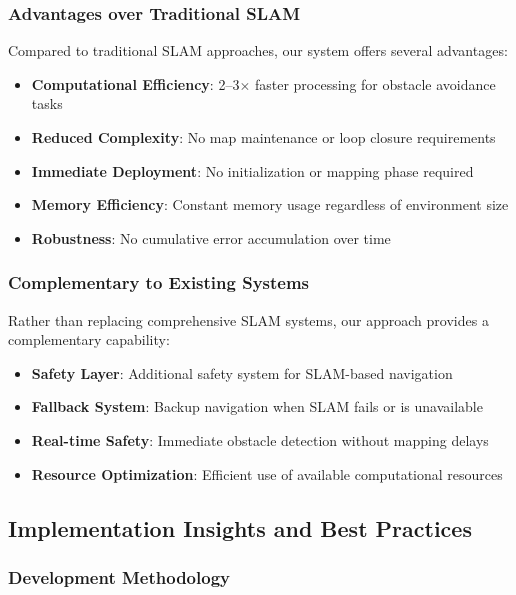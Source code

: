 \documentclass[12pt,oneside]{book}
\begin{document}
\subsubsection{Advantages over Traditional SLAM}

Compared to traditional SLAM approaches, our system offers several advantages:

\begin{itemize}
\item \textbf{Computational Efficiency}: 2--3$\times$ faster processing for obstacle avoidance tasks
\item \textbf{Reduced Complexity}: No map maintenance or loop closure requirements
\item \textbf{Immediate Deployment}: No initialization or mapping phase required
\item \textbf{Memory Efficiency}: Constant memory usage regardless of environment size
\item \textbf{Robustness}: No cumulative error accumulation over time
\end{itemize}

\subsubsection{Complementary to Existing Systems}

Rather than replacing comprehensive SLAM systems, our approach provides a complementary capability:

\begin{itemize}
\item \textbf{Safety Layer}: Additional safety system for SLAM-based navigation
\item \textbf{Fallback System}: Backup navigation when SLAM fails or is unavailable
\item \textbf{Real-time Safety}: Immediate obstacle detection without mapping delays
\item \textbf{Resource Optimization}: Efficient use of available computational resources
\end{itemize}

\subsection{Implementation Insights and Best Practices}

\subsubsection{Development Methodology}
\end{document}
